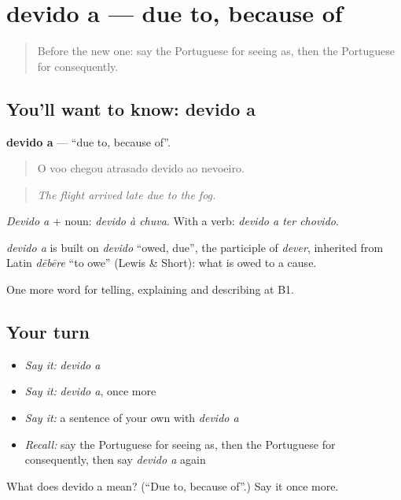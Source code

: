 \section[devido a]{devido a — due to, because of}

\label{lesson:PT-C349-devido-a}



\begin{quote}
Before the new one: say the Portuguese for seeing as, then the Portuguese for consequently.
\end{quote}

\subsection*{You'll want to know: devido a}
\textbf{devido a} — \textquotedblleft{}due to, because of\textquotedblright{}.

\begin{quote}
O voo chegou atrasado devido ao nevoeiro.
\end{quote}

\begin{quote}
\emph{The flight arrived late due to the fog.}
\end{quote}

\emph{Devido a} + noun: \emph{devido à chuva}. With a verb: \emph{devido a ter chovido}.

\begin{cousinweb}
\emph{devido a} is built on \emph{devido} \textquotedblleft{}owed, due\textquotedblright{}, the participle of \emph{dever}, inherited from Latin \emph{dēbēre} \textquotedblleft{}to owe\textquotedblright{} (Lewis \& Short): what is owed to a cause.
\end{cousinweb}

\begin{grammarlens}[title={What you've built}]
One more word for telling, explaining and describing at B1.
\end{grammarlens}

\subsection*{Your turn}
\begin{itemize}
\raggedright
  \item \emph{Say it:} \emph{devido a}
  \item \emph{Say it:} \emph{devido a}, once more
  \item \emph{Say it:} a sentence of your own with \emph{devido a}
  \item \emph{Recall:} say the Portuguese for seeing as, then the Portuguese for consequently, then say \emph{devido a} again
\end{itemize}

\begin{tcolorbox}[breakable,colback=teal!4,colframe=teal!35!black,title={Before you move on}]
What does devido a mean? (\textquotedblleft{}Due to, because of\textquotedblright{}.) Say it once more.
\end{tcolorbox}
